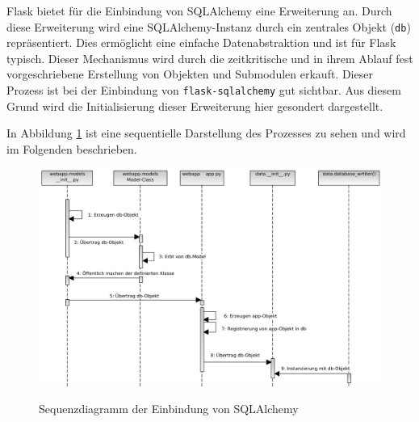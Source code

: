 Flask bietet für die Einbindung von SQLAlchemy eine Erweiterung an.
Durch diese Erweiterung wird eine SQLAlchemy-Instanz durch ein zentrales Objekt (\texttt{db}) repräsentiert. Dies ermöglicht eine einfache Datenabstraktion und ist für Flask typisch. Dieser Mechanismus wird durch die zeitkritische und in ihrem Ablauf fest vorgeschriebene Erstellung von Objekten und Submodulen erkauft.
Dieser Prozess ist bei der Einbindung von \texttt{flask-sqlalchemy} gut sichtbar. Aus diesem Grund wird die Initialisierung dieser Erweiterung hier gesondert dargestellt.

In Abbildung \ref{fig:sequenzSQLALCHEMY} ist eine sequentielle Darstellung des Prozesses zu sehen und wird im Folgenden beschrieben.

\begin{figure}[H]
 \centering
 \includegraphics[width=\textwidth]{pix/seq_db.png}
 \label{fig:sequenzSQLALCHEMY}
 \caption{Sequenzdiagramm der Einbindung von SQLAlchemy}
\end{figure}



